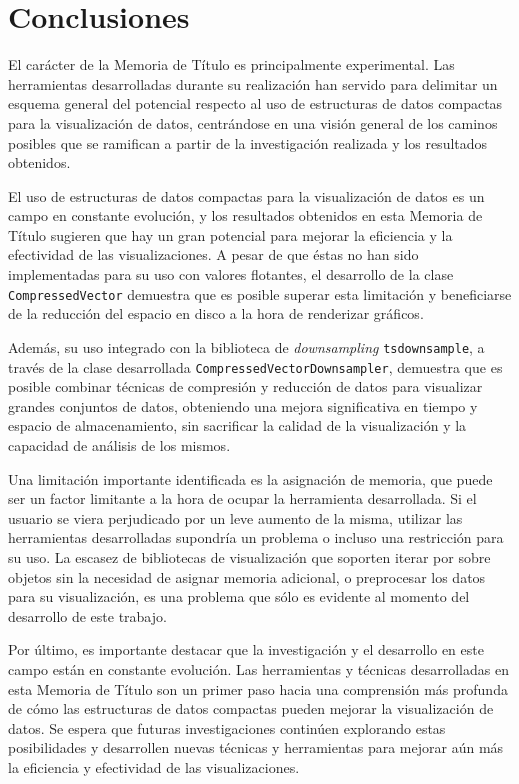 \chapter{Conclusiones}

El carácter de la Memoria de Título es principalmente experimental. Las herramientas desarrolladas durante su realización han servido para delimitar un esquema general del potencial respecto al uso de estructuras de datos compactas para la visualización de datos, centrándose en una visión general de los caminos posibles que se ramifican a partir de la investigación realizada y los resultados obtenidos.

El uso de estructuras de datos compactas para la visualización de datos es un campo en constante evolución, y los resultados obtenidos en esta Memoria de Título sugieren que hay un gran potencial para mejorar la eficiencia y la efectividad de las visualizaciones. A pesar de que éstas no han sido implementadas para su uso con valores flotantes, el desarrollo de la clase \texttt{CompressedVector} demuestra que es posible superar esta limitación y beneficiarse de la reducción del espacio en disco a la hora de renderizar gráficos.

Además, su uso integrado con la biblioteca de \textit{downsampling} \texttt{tsdownsample}, a través de la clase desarrollada \texttt{CompressedVectorDownsampler}, demuestra que es posible combinar técnicas de compresión y reducción de datos para visualizar grandes conjuntos de datos, obteniendo una mejora significativa en tiempo y espacio de almacenamiento, sin sacrificar la calidad de la visualización y la capacidad de análisis de los mismos.

Una limitación importante identificada es la asignación de memoria, que puede ser un factor limitante a la hora de ocupar la herramienta desarrollada. Si el usuario se viera perjudicado por un leve aumento de la misma, utilizar las herramientas desarrolladas supondría un problema o incluso una restricción para su uso.
La escasez de bibliotecas de visualización que soporten iterar por sobre objetos sin la necesidad de asignar memoria adicional, o preprocesar los datos para su visualización, es una problema que sólo es evidente al momento del desarrollo de este trabajo.

Por último, es importante destacar que la investigación y el desarrollo en este campo están en constante evolución. Las herramientas y técnicas desarrolladas en esta Memoria de Título son un primer paso hacia una comprensión más profunda de cómo las estructuras de datos compactas pueden mejorar la visualización de datos. Se espera que futuras investigaciones continúen explorando estas posibilidades y desarrollen nuevas técnicas y herramientas para mejorar aún más la eficiencia y efectividad de las visualizaciones.

